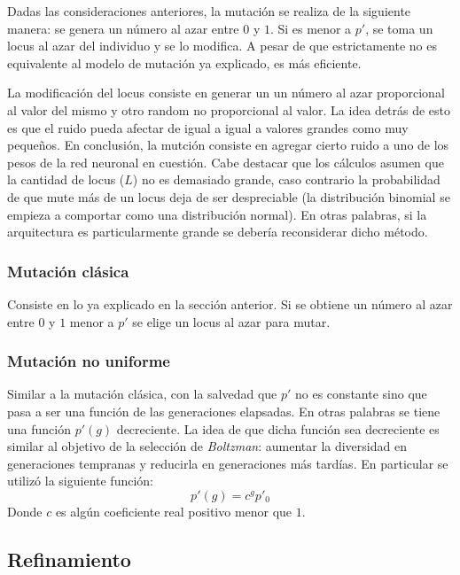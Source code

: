 \documentclass[%
    final,
    reprint,
    notitlepage,
    narroweqnarray,
    inline,
    twoside,
    invited
    ]{ieee}
\begin{document}
\par Dadas las consideraciones anteriores, la mutación se realiza de la siguiente manera: 
se genera un número al azar entre $0$ y $1$. Si es menor a $p'$, se toma un locus al azar del individuo y se 
lo modifica. A pesar de que 
estrictamente no es equivalente al modelo de mutación ya explicado, es más eficiente. 
\par La modificación del locus consiste en generar un  
un número al azar proporcional al valor del mismo y otro random no proporcional al valor. La 
idea detrás de esto es que el ruido pueda afectar de igual a igual a valores grandes como muy pequeños. 
En conclusión, la mutción consiste en agregar cierto ruido a uno de los pesos de la red neuronal en cuestión. Cabe 
destacar que los cálculos asumen que la cantidad de locus ($L$) no es demasiado grande, caso contrario la probabilidad 
de que mute más de un locus deja de ser despreciable (la distribución binomial se empieza a comportar 
como una distribución normal). En otras palabras, si la arquitectura es particularmente grande 
se debería reconsiderar dicho método.

\subsubsection{Mutación clásica}

Consiste en lo ya explicado en la sección anterior. Si se obtiene un número al azar entre $0$ y $1$ menor a 
$p'$ se elige un locus al azar para mutar.

\subsubsection{Mutación no uniforme}

Similar a la mutación clásica, con la salvedad que $p'$ no es constante sino que pasa a ser una función 
de las generaciones elapsadas. En otras palabras se tiene una función $p'(g)$ decreciente. La idea de que 
dicha función sea decreciente es similar al objetivo de la selección de \textit{Boltzman}: aumentar la diversidad 
en generaciones tempranas y reducirla en generaciones más tardías. En particular se utilizó la siguiente función:
\[p'(g) = c^{g}p'_0\]
Donde $c$ es algún coeficiente real positivo menor que $1$.

\subsection{Refinamiento}
\end{document}
